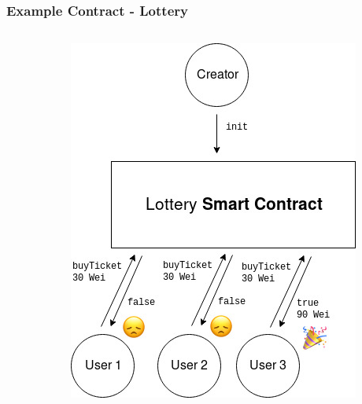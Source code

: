 \documentclass[aspectratio=169]{beamer}
\begin{document}
\begin{frame}
\frametitle{Example Contract - Lottery}
\begin{columns}
\begin{column}{0.5\textwidth}
  \inputminted[fontsize=\tiny]{swift}{code/lottery.flint}
\end{column}
\begin{column}{0.5\textwidth}
  \includegraphics[scale=0.4]{figures/lottery_diagram.jpg}
\end{column}
\end{columns}
\end{frame}
\end{document}
